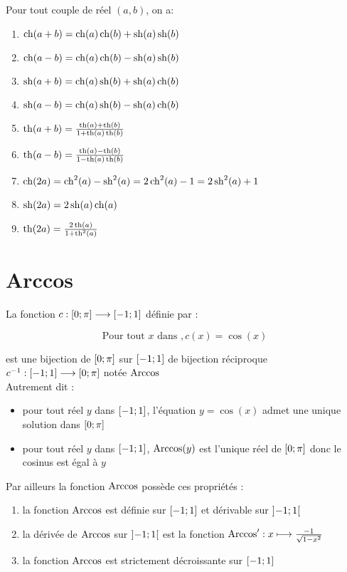 \begin{defprop}
    Pour tout couple de réel \((a,b)\), on a:
    \begin{enumerate}
        \item \(\operatorname{ch}(a+b) = \operatorname{ch}(a)\operatorname{ch}(b)+\operatorname{sh}(a)\operatorname{sh}(b)\)
        \item \(\operatorname{ch}(a-b) = \operatorname{ch}(a)\operatorname{ch}(b)-\operatorname{sh}(a)\operatorname{sh}(b)\)
        \item \(\operatorname{sh}(a+b) = \operatorname{ch}(a)\operatorname{sh}(b)+\operatorname{sh}(a)\operatorname{ch}(b)\)
        \item \(\operatorname{sh}(a-b) = \operatorname{ch}(a)\operatorname{sh}(b)-\operatorname{sh}(a)\operatorname{ch}(b)\)
        \item \(\operatorname{th}(a+b) = \frac{\operatorname{th}(a)+\operatorname{th}(b)}{1+\operatorname{th}(a)\operatorname{th}(b)}\)
        \item \(\operatorname{th}(a-b) = \frac{\operatorname{th}(a)-\operatorname{th}(b)}{1-\operatorname{th}(a)\operatorname{th}(b)}\)
        \item \(\operatorname{ch}(2a) = \operatorname{ch}^2(a)-\operatorname{sh}^2(a) = 2\operatorname{ch}^2(a)-1 = 2\operatorname{sh}^2(a) +1\)
        \item \(\operatorname{sh}(2a) = 2\operatorname{sh}(a)\operatorname{ch}(a)\)
        \item \(\operatorname{th}(2a) = \frac{2\operatorname{th}(a)}{1+\operatorname{th}^2(a)}\)
    \end{enumerate}
\end{defprop}

\section{Arccos}
\begin{defprop}
    La fonction \(c : \left[0;\pi\right] \longrightarrow \left[-1;1\right]\) définie par :

    \[\text{Pour tout } x \text{ dans },c(x) = \cos(x)\] 
    
    est une bijection de \(\left[0;\pi\right]\) sur \(\left[-1;1\right]\) de bijection réciproque \(c^{-1} : \left[-1;1\right] \longrightarrow \left[0;\pi\right]\) notée \(\operatorname{Arccos}\)
    \\ Autrement dit : 
    \begin{itemize}
        \item pour tout réel \(y\) dans \(\left[-1;1\right]\), l'équation \(y=\cos(x)\) admet une unique solution dans \(\left[0;\pi\right]\)
        \item pour tout réel \(y\) dans \(\left[-1;1\right]\), \(\operatorname{Arccos} (y)\) est l'unique réel de \(\left[0;\pi\right]\) donc le cosinus est égal à \(y\)
    \end{itemize}
    Par ailleurs la fonction \(\operatorname{Arccos}\) possède ces propriétés : 
    \begin{enumerate}
        \item la fonction \(\operatorname{Arccos}\) est définie sur \(\left[-1;1\right]\) et dérivable sur \(\left]-1;1\right[\)
        \item la dérivée de \(\operatorname{Arccos}\) sur \(\left]-1;1\right[\) est la fonction \(\operatorname{Arccos}' : x\longmapsto \frac{-1}{\sqrt{1-x^2}} \)
        \item la fonction \(\operatorname{Arccos}\) est strictement décroissante sur \(\left[-1;1\right]\)
    \end{enumerate}
\end{defprop}

